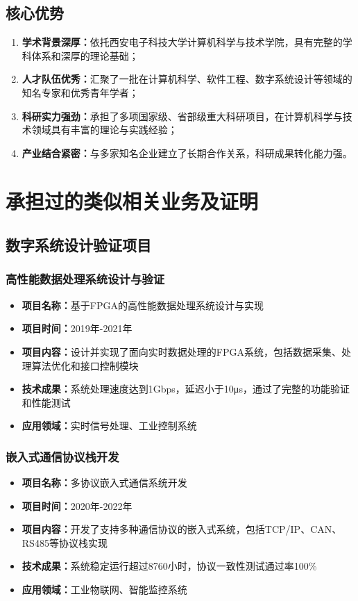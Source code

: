 \documentclass[fontset=windows]{article}
\begin{document}
\subsection{核心优势}
\begin{enumerate}[label=(\arabic*)]
    \item \textbf{学术背景深厚：}依托西安电子科技大学计算机科学与技术学院，具有完整的学科体系和深厚的理论基础；
    \item \textbf{人才队伍优秀：}汇聚了一批在计算机科学、软件工程、数字系统设计等领域的知名专家和优秀青年学者；
    \item \textbf{科研实力强劲：}承担了多项国家级、省部级重大科研项目，在计算机科学与技术领域具有丰富的理论与实践经验；
    \item \textbf{产业结合紧密：}与多家知名企业建立了长期合作关系，科研成果转化能力强。
\end{enumerate}

\section{承担过的类似相关业务及证明}

\subsection{数字系统设计验证项目}

\subsubsection{高性能数据处理系统设计与验证}
\begin{itemize}
    \item \textbf{项目名称：}基于FPGA的高性能数据处理系统设计与实现
    \item \textbf{项目时间：}2019年-2021年
    \item \textbf{项目内容：}设计并实现了面向实时数据处理的FPGA系统，包括数据采集、处理算法优化和接口控制模块
    \item \textbf{技术成果：}系统处理速度达到1Gbps，延迟小于10μs，通过了完整的功能验证和性能测试
    \item \textbf{应用领域：}实时信号处理、工业控制系统
\end{itemize}

\subsubsection{嵌入式通信协议栈开发}
\begin{itemize}
    \item \textbf{项目名称：}多协议嵌入式通信系统开发
    \item \textbf{项目时间：}2020年-2022年
    \item \textbf{项目内容：}开发了支持多种通信协议的嵌入式系统，包括TCP/IP、CAN、RS485等协议栈实现
    \item \textbf{技术成果：}系统稳定运行超过8760小时，协议一致性测试通过率100\%
    \item \textbf{应用领域：}工业物联网、智能监控系统
\end{itemize}
\end{document}

